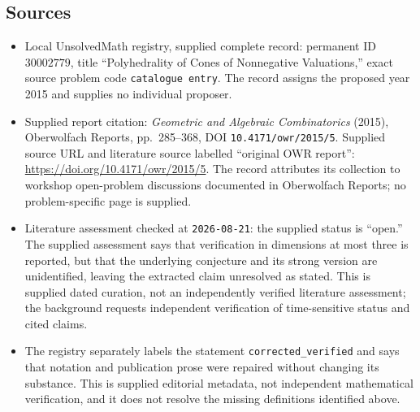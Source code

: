 \documentclass[11pt]{article}
\begin{document}
\subsection{Sources}
\begin{itemize}
\item Local UnsolvedMath registry, supplied complete record: permanent ID \(30002779\), title ``Polyhedrality of Cones of Nonnegative Valuations,'' exact source problem code \texttt{catalogue entry}. The record assigns the proposed year 2015 and supplies no individual proposer.
\item Supplied report citation: \emph{Geometric and Algebraic Combinatorics} (2015), Oberwolfach Reports, pp.\ 285--368, DOI \texttt{10.4171/owr/2015/5}. Supplied source URL and literature source labelled ``original OWR report'': \url{https://doi.org/10.4171/owr/2015/5}. The record attributes its collection to workshop open-problem discussions documented in Oberwolfach Reports; no problem-specific page is supplied.
\item Literature assessment checked at \texttt{2026-08-21}: the supplied status is ``open.'' The supplied assessment says that verification in dimensions at most three is reported, but that the underlying conjecture and its strong version are unidentified, leaving the extracted claim unresolved as stated. This is supplied dated curation, not an independently verified literature assessment; the background requests independent verification of time-sensitive status and cited claims.
\item The registry separately labels the statement \texttt{corrected\_verified} and says that notation and publication prose were repaired without changing its substance. This is supplied editorial metadata, not independent mathematical verification, and it does not resolve the missing definitions identified above.
\end{itemize}
\end{document}
